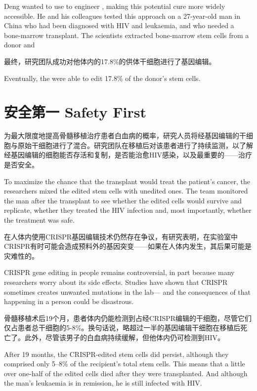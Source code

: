 \begin{multicols}{2}
Deng wanted to use  to engineer , making this potential cure more widely accessible. He and his colleagues tested this approach on a 27-year-old man in China who had been diagnosed with HIV and leukaemia, and who needed a bone-marrow transplant. The scientists extracted bone-marrow stem cells from a donor and 

最终，研究团队成功对他体内的17.8\%的供体干细胞进行了基因编辑。

Eventually, the were able to edit 17.8\% of the donor’s stem cells.

\section*{安全第一 Safety First}

为最大限度地提高骨髓移植治疗患者白血病的概率，研究人员将经基因编辑的干细胞与原始干细胞进行了混合。研究团队在移植后对该患者进行了持续监测，以了解经基因编辑的细胞能否存活和复制，是否能治愈HIV感染，以及最重要的——治疗是否安全。

To maximize the chance that the transplant would treat the patient’s cancer, the researchers mixed the edited stem cells with unedited ones. The team monitored the man after the transplant to see whether the edited cells would survive and replicate, whether they treated the HIV infection and, most importantly, whether the treatment was safe.

在人体内使用CRISPR基因编辑技术仍然存在争议，有研究表明，在实验室中CRISPR有时可能会造成预料外的基因突变——如果在人体内发生，其后果可能是灾难性的。

CRISPR gene editing in people remains controversial, in part because many researchers worry about its side effects. Studies have shown that CRISPR sometimes creates unwanted mutations in the lab— and the consequences of that happening in a person could be disastrous.

骨髓移植术后19个月，患者体内仍能检测到占经CRISPR编辑的干细胞，尽管它们仅占患者总干细胞的5-8\%。换句话说，略超过一半的基因编辑干细胞在移植后死亡了。此外，尽管该男子的白血病持续缓解，但他体内仍可检测到HIV。

After 19 months, the CRISPR-edited stem cells did persist, although they comprised only 5–8\% of the recipient’s total stem cells. This means that a little over one-half of the edited cells died after they were transplanted. And although the man’s leukaemia is in remission, he is still infected with HIV.


\end{multicols}
